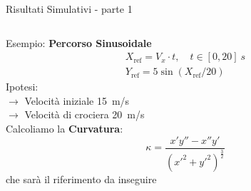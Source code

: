 \documentclass{beamer}
\begin{document}
\begin{frame}{Risultati Simulativi - parte 1}
\begin{columns}[onlytextwidth,T]
			\begin{column}[c]{0.55\columnwidth}
				Esempio: \textbf{Percorso Sinusoidale}
				\begin{equation*}
				\begin{array}{ll}
				X_\text{ref}=V_x\cdot t,\quad t\in[0,20]\SI{}{s}\\ Y_\text{ref}=5\sin(X_\text{ref}/20) 
				\end{array}
				\end{equation*}
				Ipotesi:\\
				{\hspace{1em}
				$\rightarrow$ Velocità iniziale \SI{15}{m/s}\\
				\hspace{1em} $\rightarrow$ Velocità di crociera \SI{20}{m/s}\\}
				\vspace{1.5em}
				Calcoliamo la \textbf{Curvatura}:
				\begin{equation*}
				\label{eqn:curvature}
				\kappa=\frac{x'y''-x''y'}{(x'^2+y'^2)^\frac{3}{2}}
				\end{equation*}
				che sarà il riferimento da inseguire
			\end{column}	
		\end{columns}		
	\end{frame}
		
\end{document}
